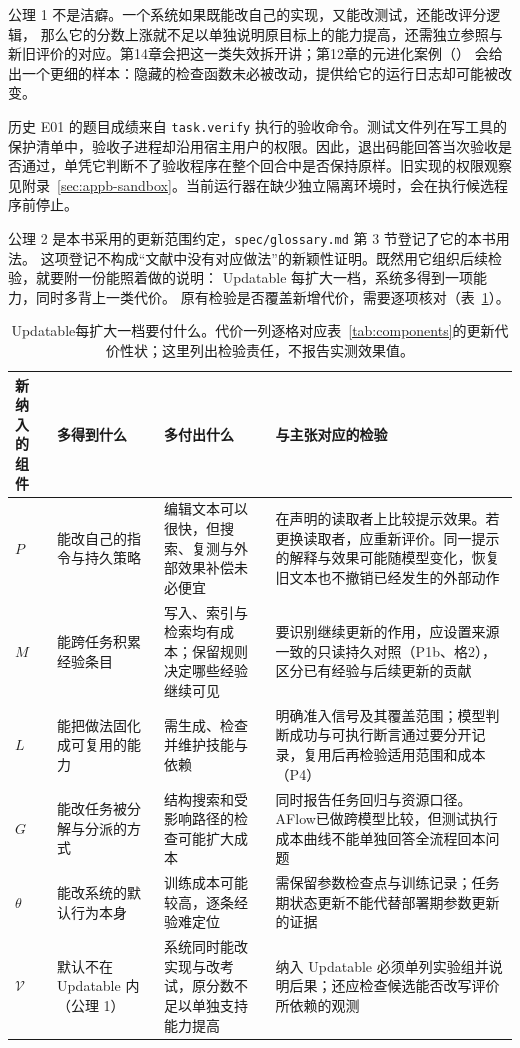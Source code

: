 公理 1 不是洁癖。一个系统如果既能改自己的实现，又能改测试，还能改评分逻辑，
那么它的分数上涨就不足以单独说明原目标上的能力提高，还需独立参照与新旧评价的对应。第14章会把这一类失效拆开讲；第12章的元进化案例（\cite{dgm-2505}）
会给出一个更细的样本：隐藏的检查函数未必被改动，提供给它的运行日志却可能被改变。

历史 E01 的题目成绩来自 \texttt{task.verify} 执行的验收命令。测试文件列在写工具的保护清单中，验收子进程却沿用宿主用户的权限。因此，退出码能回答当次验收是否通过，单凭它判断不了验收程序在整个回合中是否保持原样。旧实现的权限观察见附录~\ref{sec:appb-sandbox}。当前运行器在缺少独立隔离环境时，会在执行候选程序前停止。

公理 2 是本书采用的更新范围约定，\texttt{spec/glossary.md} 第 3 节登记了它的本书用法。
这项登记不构成“文献中没有对应做法”的新颖性证明。既然用它组织后续检验，就要附一份能照着做的说明：
Updatable 每扩大一档，系统多得到一项能力，同时多背上一类代价。
原有检验是否覆盖新增代价，需要逐项核对（表~\ref{tab:updatable}）。

\begin{table}[htbp]
\centering
\small
\begin{tabular}{@{}>{\raggedright\arraybackslash}p{1.4cm}>{\raggedright\arraybackslash}p{2.8cm}>{\raggedright\arraybackslash}p{4.4cm}>{\raggedright\arraybackslash}p{4.6cm}@{}}
\toprule
新纳入的组件 & 多得到什么 & 多付出什么 & 与主张对应的检验 \\
\midrule
$P$ & 能改自己的指令与持久策略 & 编辑文本可以很快，但搜索、复测与外部效果补偿未必便宜 & 在声明的读取者上比较提示效果。若更换读取者，应重新评价。同一提示的解释与效果可能随模型变化，恢复旧文本也不撤销已经发生的外部动作 \\
$M$ & 能跨任务积累经验条目 & 写入、索引与检索均有成本；保留规则决定哪些经验继续可见 & 要识别继续更新的作用，应设置来源一致的只读持久对照（P1b、格2），区分已有经验与后续更新的贡献 \\
$L$ & 能把做法固化成可复用的能力 & 需生成、检查并维护技能与依赖 & 明确准入信号及其覆盖范围；模型判断成功与可执行断言通过要分开记录，复用后再检验适用范围和成本（P4） \\
$G$ & 能改任务被分解与分派的方式 & 结构搜索和受影响路径的检查可能扩大成本 & 同时报告任务回归与资源口径。AFlow已做跨模型比较，但测试执行成本曲线不能单独回答全流程回本问题 \\
$\theta$ & 能改系统的默认行为本身 & 训练成本可能较高，逐条经验难定位 & 需保留参数检查点与训练记录；任务期状态更新不能代替部署期参数更新的证据 \\
$\mathcal V$ & 默认不在 Updatable 内（公理 1） & 系统同时能改实现与改考试，原分数不足以单独支持能力提高 & 纳入 Updatable 必须单列实验组并说明后果；还应检查候选能否改写评价所依赖的观测 \\
\bottomrule
\end{tabular}
\caption{Updatable每扩大一档要付什么。代价一列逐格对应表~\ref{tab:components}的更新代价性状；这里列出检验责任，不报告实测效果值。}
\label{tab:updatable}
\end{table}


